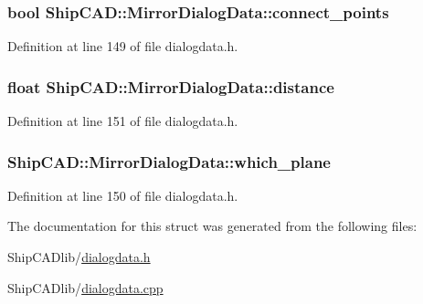 \subsubsection[{\texorpdfstring{connect\+\_\+points}{connect_points}}]{\setlength{\rightskip}{0pt plus 5cm}bool Ship\+C\+A\+D\+::\+Mirror\+Dialog\+Data\+::connect\+\_\+points}\hypertarget{structShipCAD_1_1MirrorDialogData_a6e3cdbe59eeedec71b5d3b56e5414516}{}\label{structShipCAD_1_1MirrorDialogData_a6e3cdbe59eeedec71b5d3b56e5414516}


Definition at line 149 of file dialogdata.\+h.

\subsubsection[{\texorpdfstring{distance}{distance}}]{\setlength{\rightskip}{0pt plus 5cm}float Ship\+C\+A\+D\+::\+Mirror\+Dialog\+Data\+::distance}\hypertarget{structShipCAD_1_1MirrorDialogData_ab692a899cc809b67fd65fee10848e863}{}\label{structShipCAD_1_1MirrorDialogData_ab692a899cc809b67fd65fee10848e863}


Definition at line 151 of file dialogdata.\+h.

\subsubsection[{\texorpdfstring{which\+\_\+plane}{which_plane}}]{ Ship\+C\+A\+D\+::\+Mirror\+Dialog\+Data\+::which\+\_\+plane}\hypertarget{structShipCAD_1_1MirrorDialogData_a4e17198aa242bba6426a2b28840ceca5}{}\label{structShipCAD_1_1MirrorDialogData_a4e17198aa242bba6426a2b28840ceca5}


Definition at line 150 of file dialogdata.\+h.



The documentation for this struct was generated from the following files\+:\begin{DoxyCompactItemize}
\item 
Ship\+C\+A\+Dlib/\hyperlink{dialogdata_8h}{dialogdata.\+h}\item 
Ship\+C\+A\+Dlib/\hyperlink{dialogdata_8cpp}{dialogdata.\+cpp}\end{DoxyCompactItemize}
